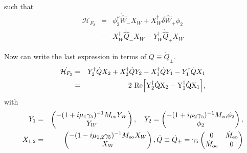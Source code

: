 \documentclass{article}[12pt]
\begin{document}
such that 
\begin{eqnarray}
\dot{\mathcal{H}_{F_2}} &=& \phi_2^\dagger  \dot{\hat{W}}_- X_W +
X_W^\dagger  \delta \hat{W}_+ \phi_2 \\
&-& X_W^\dagger \dot{\hat{Q}}_- X_W - Y_W^\dagger   \dot{\hat{Q}}_+  X_W
\end{eqnarray}


Now can write the last expression in terms of $\dot{Q} \equiv
\dot{Q}_{\pm} $.
\begin{eqnarray}
\dot{\mathcal{H}_{F_2}} &=& Y_2^\dagger \dot{Q} X_2 + X_2^\dagger
\dot{Q} Y_2 - X_1^\dagger \dot{Q} Y_1  - Y_1^\dagger \dot{Q} X_1 \\
&=& 2~ \rm{Re}\Big[ Y_2^\dagger \dot{Q} X_2 - Y_1^\dagger \dot{Q}
X_1 \Big],
\end{eqnarray}
with 
\begin{eqnarray}
Y_1 &=& \begin{pmatrix} - (1+i\mu_1\gamma_5)^{-1} M_{\rm{eo}} Y_W \\
  Y_W \end{pmatrix},\quad Y_2  =  \begin{pmatrix} - (1+i\mu_2\gamma_5)^{-1} M_{\rm{eo}} \phi_2 \\
  \phi_2 \end{pmatrix},\\
X_{1,2} &=&  \begin{pmatrix} - (1-i\mu_{1,2}\gamma_5)^{-1} M_{\rm{eo}} X_W \\
  X_W \end{pmatrix}, \dot{Q} \equiv  \dot{Q}_{\pm} =  \gamma_5 \begin{pmatrix} 
 0  & \dot{M}_{\rm{eo}} \\
\dot{M}_{\rm{oe}} & 0\\
\end{pmatrix}
\end{eqnarray}



\end{document}
